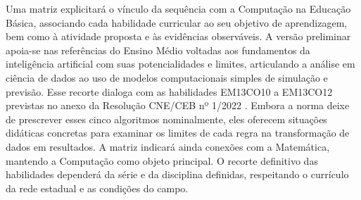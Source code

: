 Uma matriz explicitará o vínculo da sequência com a Computação na Educação Básica, associando cada habilidade curricular ao seu objetivo de aprendizagem, bem como à atividade proposta e às evidências observáveis. A versão preliminar apoia-se nas referências do Ensino Médio voltadas aos fundamentos da inteligência artificial com suas potencialidades e limites, articulando a análise em ciência de dados ao uso de modelos computacionais simples de simulação e previsão. Esse recorte dialoga com as habilidades EM13CO10 a EM13CO12 previstas no anexo da Resolução CNE/CEB nº 1/2022 \cite{brasil2022computacao}. Embora a norma deixe de prescrever esses cinco algoritmos nominalmente, eles oferecem situações didáticas concretas para examinar os limites de cada regra na transformação de dados em resultados. A matriz indicará ainda conexões com a Matemática, mantendo a Computação como objeto principal. O recorte definitivo das habilidades dependerá da série e da disciplina definidas, respeitando o currículo da rede estadual e as condições do campo.
